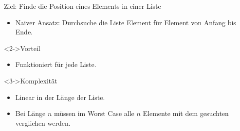 \begin{frame}
    \begin{block}{Ziel: Finde die Position eines Elements in einer Liste}
        \begin{itemize}
            \item Naiver Ansatz: Durchsuche die Liste Element für Element von Anfang bis Ende.
        \end{itemize}
    \end{block}
    \begin{block}<2->{Vorteil}
        \begin{itemize}
            \item Funktioniert für jede Liste.
        \end{itemize}
    \end{block}
    \begin{block}<3->{Komplexität}
        \begin{itemize}
            \item Linear in der Länge der Liste.
            \item Bei Länge $n$ müssen im Worst Case alle $n$ Elemente mit dem gesuchten verglichen werden. 
        \end{itemize}
    \end{block}
\end{frame}
